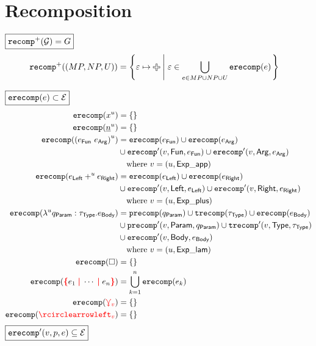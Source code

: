 
\section{Recomposition}

$\boxed{\operatorname{\texttt{recomp}^{+}}\mathopen{}\left(\mathcal{G}\right)\mathclose{} = G}$
%
\begin{align*}
  \recompPlus{(MP, NP, U)} &= \SetOf{\e \mapsto \Plus \SuchThat{\e \in \bigcup_{e \in MP \cup NP \cup U} \erecomp{e}}}
\end{align*}

\noindent $\boxed{\operatorname{\texttt{erecomp}}\mathopen{}\left(e\right)\mathclose{} \subset \mathcal{E}}$
%
\begin{align*}
  \erecomp{\varExp{x}{u}} &= \{\}
  \\
  \erecomp{\numExp{n}{u}} &= \{\}
  \\
  \erecomp{\appExp{e_\AppFun}{e_\AppArg}{u}}
  &= \erecomp{e_\AppFun}
  \cup \erecomp{e_\AppArg} \\
  &\cup \erecompPrime{v}{\AppFun}{e_\AppFun}
  \cup \erecompPrime{v}{\AppArg}{e_\AppArg} \\
  &\quad\text{where } v = (u, \ExpApp)
  \\
  \erecomp{\plusExp{e_\PlusLeft}{u}{e_\PlusRight}}
  &= \erecomp{e_\PlusLeft}
  \cup \erecomp{e_\PlusRight} \\
  &\cup \erecompPrime{v}{\PlusLeft}{e_\PlusLeft}
  \cup \erecompPrime{v}{\PlusRight}{e_\PlusRight} \\
  &\quad\text{where } v = (u, \ExpPlus)
  \\
  \erecomp{\lamExp{u}{q_\LamParam}{\tau_\LamType}{e_\LamBody}}
  &= \precomp{q_\LamParam}
  \cup \trecomp{\tau_\LamType}
  \cup \erecomp{e_\LamBody} \\
  &\cup \precompPrime{v}{\LamParam}{q_\LamParam}
  \cup \trecompPrime{v}{\LamType}{\tau_\LamType} \\
  &\cup \erecompPrime{v}{\LamBody}{e_\LamBody} \\
  &\quad\text{where } v = (u, \ExpLam)
  \\
  \erecomp{\hole} &= \{\}
  \\
  \erecomp{\conflictHole{e_1, \cdots, e_n}}
  &= \bigcup_{k=1}^n \erecomp{e_k}
  \\
  \erecomp{\multiVertex{v}} &= \{\}
  \\
  \erecomp{\cycleVertex{v}} &= \{\}
\end{align*}
%
$\boxed{\operatorname{\operatorname{\texttt{erecomp}}^\prime}\mathopen{}\left(v, p, e\right)\mathclose{} \subseteq \mathcal{E}}$
%

